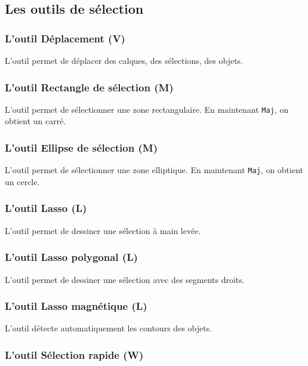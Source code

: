 \subsection{Les outils de sélection}

\subsubsection{L'outil Déplacement (V)}

L'outil  permet de déplacer des calques, des sélections, des objets.

\subsubsection{L'outil Rectangle de sélection (M)}

L'outil  permet de sélectionner une zone rectangulaire. En maintenant \texttt{Maj}, on obtient un carré.

\subsubsection{L'outil Ellipse de sélection (M)}

L'outil  permet de sélectionner une zone elliptique. En maintenant \texttt{Maj}, on obtient un cercle.

\subsubsection{L'outil Lasso (L)}

L'outil  permet de dessiner une sélection à main levée.

\subsubsection{L'outil Lasso polygonal (L)}

L'outil  permet de dessiner une sélection avec des segments droits.

\subsubsection{L'outil Lasso magnétique (L)}

L'outil  détecte automatiquement les contours des objets.

\subsubsection{L'outil Sélection rapide (W)}

